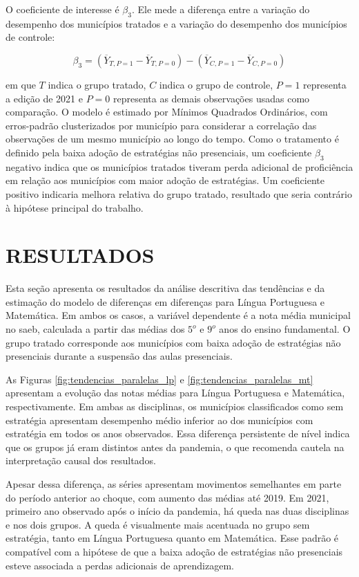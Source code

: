 \documentclass[
	12pt,				%
	openright,			%
	oneside,			%
	a4paper,			%
	brazil,				%
	]{article}
\begin{document}
O coeficiente de interesse é $\beta_3$. Ele mede a diferença entre a variação
do desempenho dos municípios tratados e a variação do desempenho dos municípios
de controle:

\begin{equation}
\beta_3 =
(\overline{Y}_{T,P=1} - \overline{Y}_{T,P=0}) -
(\overline{Y}_{C,P=1} - \overline{Y}_{C,P=0})
\end{equation}

em que $T$ indica o grupo tratado, $C$ indica o grupo de controle, $P=1$
representa a edição de 2021 e $P=0$ representa as demais observações usadas como
comparação. O modelo é estimado por Mínimos Quadrados Ordinários, com
erros-padrão clusterizados por município para considerar a correlação das
observações de um mesmo município ao longo do tempo. Como o tratamento é
definido pela baixa adoção de estratégias não presenciais, um coeficiente
$\beta_3$ negativo indica que os municípios tratados tiveram perda adicional de
proficiência em relação aos municípios com maior adoção de estratégias. Um
coeficiente positivo indicaria melhora relativa do grupo tratado, resultado que
seria contrário à hipótese principal do trabalho.

\newpage
\section{RESULTADOS}

Esta seção apresenta os resultados da análise descritiva das tendências e da
estimação do modelo de diferenças em diferenças para Língua Portuguesa e Matemática.
Em ambos os casos, a variável dependente é a nota média municipal no \acrshort{saeb},
calculada a partir das médias dos $5^{o}$ e $9^{o}$ anos do ensino fundamental.
O grupo tratado corresponde aos municípios com baixa adoção de estratégias não
presenciais durante a suspensão das aulas presenciais.

As Figuras \ref{fig:tendencias_paralelas_lp} e \ref{fig:tendencias_paralelas_mt}
apresentam a evolução das notas médias para Língua Portuguesa e Matemática,
respectivamente. Em ambas as disciplinas, os municípios classificados como sem
estratégia apresentam desempenho médio inferior ao dos municípios com estratégia
em todos os anos observados. Essa diferença persistente de nível indica que os
grupos já eram distintos antes da pandemia, o que recomenda cautela na interpretação
causal dos resultados.

Apesar dessa diferença, as séries apresentam movimentos semelhantes em parte do
período anterior ao choque, com aumento das médias até 2019. Em 2021, primeiro
ano observado após o início da pandemia, há queda nas duas disciplinas e nos
dois grupos. A queda é visualmente mais acentuada no grupo sem estratégia, tanto
em Língua Portuguesa quanto em Matemática. Esse padrão é compatível com a
hipótese de que a baixa adoção de estratégias não presenciais esteve associada a
perdas adicionais de aprendizagem.
\end{document}
